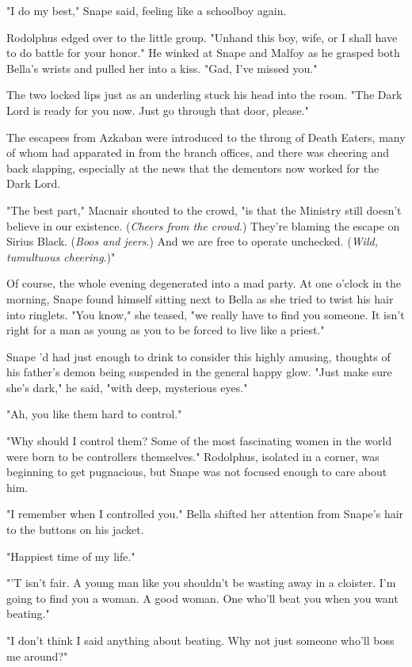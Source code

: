 "I do my best," Snape said, feeling like a schoolboy again.

Rodolphus edged over to the little group. "Unhand this boy, wife, or I shall have to do battle for your honor." He winked at Snape and Malfoy as he grasped both Bella's wrists and pulled her into a kiss. "Gad, I've missed you."

The two locked lips just as an underling stuck his head into the room. "The Dark Lord is ready for you now. Just go through that door, please."

The escapees from Azkaban were introduced to the throng of Death Eaters, many of whom had apparated in from the branch offices, and there was cheering and back slapping, especially at the news that the dementors now worked for the Dark Lord.

"The best part," Macnair shouted to the crowd, "is that the Ministry still doesn't believe in our existence. (\emph{Cheers from the crowd}.) They're blaming the escape on Sirius Black. (\emph{Boos and jeers}.) And we are free to operate unchecked. (\emph{Wild, tumultuous cheering}.)"

Of course, the whole evening degenerated into a mad party. At one o'clock in the morning, Snape found himself sitting next to Bella as she tried to twist his hair into ringlets. "You know," she teased, "we really have to find you someone. It isn't right for a man as young as you to be forced to live like a priest."

Snape 'd had just enough to drink to consider this highly amusing, thoughts of his father's demon being suspended in the general happy glow. "Just make sure she's dark," he said, "with deep, mysterious eyes."

"Ah, you like them hard to control."

"Why should I control them? Some of the most fascinating women in the world were born to be controllers themselves." Rodolphus, isolated in a corner, was beginning to get pugnacious, but Snape was not focused enough to care about him.

"I remember when I controlled you." Bella shifted her attention from Snape's hair to the buttons on his jacket.

"Happiest time of my life."

"'T isn't fair. A young man like you shouldn't be wasting away in a cloister. I'm going to find you a woman. A good woman. One who'll beat you when you want beating."

"I don't think I said anything about beating. Why not just someone who'll boss me around?"

